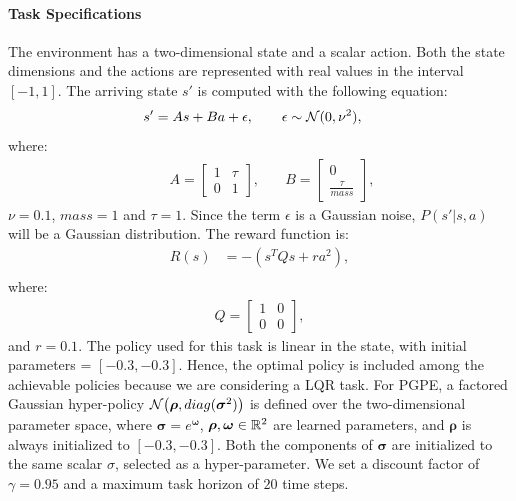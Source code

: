 \paragraph{Task Specifications} 
The environment has a two-dimensional state and a scalar action. 
Both the state dimensions and the actions are represented with real values in the interval $[-1, 1]$. The arriving state $s'$ is computed with the following equation:
\begin{align}
s' &= As + Ba + \epsilon, \qquad \epsilon\sim\mathcal{N}(0,\nu^2),\nonumber
\end{align}
where:
\begin{align}
&\quad A =
\begin{bmatrix}
1 & \tau \\
0 & 1 
\end{bmatrix}, &\quad 
B =
\begin{bmatrix}
0 \\
\frac{\tau}{mass} 
\end{bmatrix},\nonumber
\end{align}
$\nu=0.1$, $mass=1$ and $\tau = 1$.
Since the term $\epsilon$ is a Gaussian noise, $P(s'|s,a)$ will be a Gaussian distribution.
The reward function is:
\begin{align}
R(s) &= - (s^TQs + ra^2),\nonumber\\
\end{align}
where:
\begin{align}
Q =
\begin{bmatrix}
1 & 0 \\
0 & 0
\end{bmatrix},
\end{align}
and $r = 0.1 $.
The policy used for this task is linear in the state, with initial parameters = $[-0.3, -0.3]$. Hence, the optimal policy is included among the achievable policies because we are considering a \ac{LQR} task. For \ac{PGPE}, a factored Gaussian hyper-policy $\mathcal{N}\big(\boldsymbol{\rho},\mathop{diag}(\boldsymbol{\sigma}^2)\big)$ is defined over the two-dimensional parameter space, where $\boldsymbol{\sigma}=e^{\boldsymbol{\omega}}$, $\boldsymbol{\rho},\boldsymbol{\omega}\in\mathbb{R}^2$ are learned parameters, and $\boldsymbol{\rho}$ is always initialized to $[-0.3,-0.3]$. Both the components of $\boldsymbol{\sigma}$ are initialized to the same scalar $\sigma$, selected as a hyper-parameter. 
We set a discount factor of $\gamma=0.95$ and a maximum task horizon of $20$ time steps.
